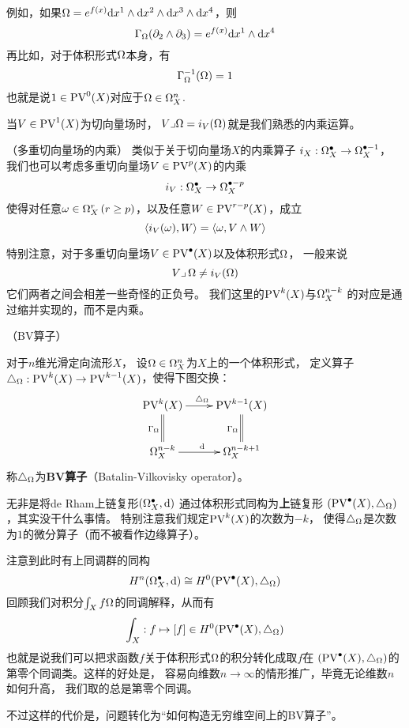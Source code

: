 例如，如果$\Omega=e^{f(x)}\mathrm{d} x^1
\wedge\mathrm{d} x^2\wedge\mathrm{d} x^3\wedge\mathrm{d} x^4$，则
$$\Gamma_\Omega(\partial_2\wedge\partial_3)=e^{f(x)}\mathrm{d} x^1\wedge\mathrm{d} x^4$$
再比如，对于体积形式$\Omega$本身，有
$$\Gamma_\Omega^{-1}(\Omega)=1$$
也就是说$1\in\operatorname{PV}^0(X)$对应于$\Omega\in\Omega^n_X$.

当$V\in\operatorname{PV}^1(X)$为切向量场时，
$V\lrcorner\Omega=i_V(\Omega)$就是我们熟悉的内乘运算。

\begin{rem}（多重切向量场的内乘）
类似于关于切向量场$X$的内乘算子
$i_X:\Omega^{\bullet}_X\to \Omega^{\bullet-1}_X$，
我们也可以考虑多重切向量场$V\in\operatorname{PV}^p(X)$的内乘
$$i_V:\Omega^{\bullet}_X\to\Omega^{\bullet-p}_X$$
使得对任意$\omega\in\Omega^r_X\,(r\geq p)$，以及任意$W\in\operatorname{PV}^{r-p}(X)$，成立
$$\langle i_V(\omega),W\rangle=\langle\omega,V\wedge W\rangle$$
\end{rem}
特别注意，对于多重切向量场$V\in\operatorname{PV}^{\bullet}(X)$以及体积形式$\Omega$，
一般来说
$$V\lrcorner\,\Omega\neq i_V(\Omega)$$
它们两者之间会相差一些奇怪的正负号。
我们这里的$\operatorname{PV}^k(X)$与$\Omega^{n-k}_X$
的对应是通过缩并实现的，而不是内乘。

\begin{definition}（BV算子）

对于$n$维光滑定向流形$X$，
设$\Omega\in\Omega^n_X$为$X$上的一个体积形式，
定义算子$\triangle_\Omega:\operatorname{PV}^{k}(X)\to\operatorname{PV}^{k-1}(X)$，使得下图交换：
$$
  \xymatrix{
     \PV^k(X)        \ar[r]^{\yc_\Omg}  \ar@{=}[d]_{\Gma_\Omg}
    &\PV^{k-1}(X)                       \ar@{=}[d]_{\Gma_\Omg}
  \\
     \Omg_X^{n-k}    \ar[r]^{\td}
    &\Omg_X^{n-k+1}
  }
$$
称$\triangle_\Omega$为\textbf{BV算子}（Batalin-Vilkovisky operator）。
\label{BV算子-def}
\end{definition}
无非是将de Rham上链复形$(\Omega^{\bullet}_X,\mathrm{d})$
通过体积形式同构为\textbf{上}链复形
$(\operatorname{PV}^{\bullet}(X),\triangle_\Omega)$，其实没干什么事情。
特别注意我们规定$\operatorname{PV}^k(X)$的次数为$-k$，
使得$\triangle_{\Omega}$是次数为$1$的微分算子（而不被看作边缘算子）。

注意到此时有上同调群的同构
$$H^n(\Omega^{\bullet}_X,\mathrm{d})\cong H^0(\operatorname{PV}^{\bullet}(X),\triangle_\Omega)$$
回顾我们对积分$\int_Xf\Omega$的同调解释，从而有
$$\int_X:f\mapsto[f]\in H^0(\operatorname{PV}^{\bullet}(X),\triangle_\Omega)$$
也就是说我们可以把求函数$f$关于体积形式$\Omega$的积分转化成取$f$在
$(\operatorname{PV}^{\bullet}(X),\triangle_\Omega)$的第零个同调类。这样的好处是，
容易向维数$n\to\infty$的情形推广，毕竟无论维数$n$如何升高，
我们取的总是第零个同调。

不过这样的代价是，问题转化为“如何构造无穷维空间上的BV算子”。

